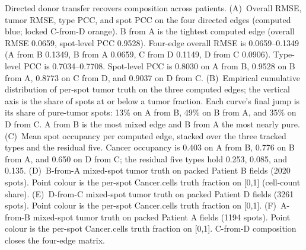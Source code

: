 Directed donor transfer recovers composition across patients. (A)~Overall RMSE, tumor RMSE, type PCC, and spot PCC on the four directed edges (computed blue; locked C-from-D orange). B from A is the tightest computed edge (overall RMSE 0.0659, spot-level PCC 0.9528). Four-edge overall RMSE is 0.0659--0.1349 (A from B 0.1349, B from A 0.0659, C from D 0.1149, D from C 0.0906). Type-level PCC is 0.7034--0.7708. Spot-level PCC is 0.8030 on A from B, 0.9528 on B from A, 0.8773 on C from D, and 0.9037 on D from C. (B)~Empirical cumulative distribution of per-spot tumor truth on the three computed edges; the vertical axis is the share of spots at or below a tumor fraction. Each curve's final jump is its share of pure-tumor spots: 13\% on A from B, 49\% on B from A, and 35\% on D from C. A from B is the most mixed edge and B from A the most nearly pure. (C)~Mean spot occupancy per computed edge, stacked over the three tracked types and the residual five. Cancer occupancy is 0.403 on A from B, 0.776 on B from A, and 0.650 on D from C; the residual five types hold 0.253, 0.085, and 0.135. (D)~B-from-A mixed-spot tumor truth on packed Patient B fields (2020 spots). Point colour is the per-spot Cancer.cells truth fraction on [0,1] (cell-count share). (E)~D-from-C mixed-spot tumor truth on packed Patient D fields (3261 spots). Point colour is the per-spot Cancer.cells truth fraction on [0,1]. (F)~A-from-B mixed-spot tumor truth on packed Patient A fields (1194 spots). Point colour is the per-spot Cancer.cells truth fraction on [0,1]. C-from-D composition closes the four-edge matrix.
